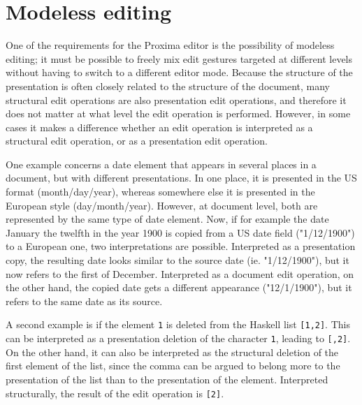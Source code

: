 %									
%									
%									
\section{Modeless editing}

One of the requirements for the Proxima editor is the possibility of modeless editing; it must be possible to freely mix edit gestures targeted at different levels without having to switch to a different editor mode. Because the structure of the presentation is often closely related to the structure of the document, many structural edit operations are also presentation edit operations, and therefore it does not matter at what level the edit operation is performed. However, in some cases it makes a difference whether an edit operation is interpreted as a structural edit operation, or as a presentation edit operation.


One example concerns a date element that appears in several places in a document, but with different presentations. In one place, it is presented in the US format (month/day/year), whereas somewhere else it is presented in the European style (day/month/year). However, at document level, both are represented by the same type of date element. Now, if for example the date January the twelfth in the year 1900 is copied from a US date field ("1/12/1900") to a European one, two interpretations are possible. Interpreted as a presentation copy, the resulting date looks similar to the source date (ie. "1/12/1900"), but it now refers to the first of December. Interpreted as a document edit operation, on the other hand, the copied date gets a different appearance ("12/1/1900"), but it refers to the same date as its source.

A second example is if the element \verb|1| is deleted from the Haskell list \verb|[1,2]|. This can be interpreted as a presentation deletion of the character \verb|1|, leading to \verb|[,2]|.  On the other hand, it can also be interpreted as the structural deletion of the first element of the list, since the comma can be argued to belong more to the presentation of the list than to the presentation of the element. Interpreted structurally, the result of the edit operation is \verb|[2]|. 

